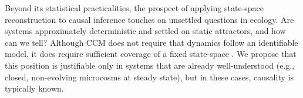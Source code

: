 Beyond its statistical practicalities, the prospect of applying state-space reconstruction to causal inference touches on unsettled questions in ecology.
Are systems approximately deterministic and settled on static attractors, and how can we tell?
Although CCM does not require that dynamics follow an identifiable model, it does require sufficient coverage of a fixed state-space \cite{Hastings2004}.
We propose that this position is justifiable only in systems that are already well-understood (e.g., closed, non-evolving microcosms at steady state), but in these cases, causality is typically known.
